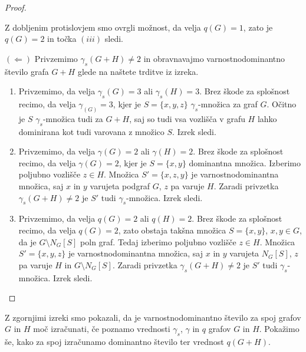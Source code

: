 \documentclass[12pt,a4paper,twoside]{article}
\theoremstyle{definition} %
\theoremstyle{plain} %
\numberwithin{equation}{section}  %
\begin{document}
\begin{proof}
\begin{itemize}
Z dobljenim protislovjem smo ovrgli možnost, da velja $q(G) =1$, zato je $q(G)=2$ in točka $(iii)$ sledi.
\end{itemize}

\noindent $(\Leftarrow)$ Privzemimo $\gamma_s(G+H) \neq 2$ in obravnavajmo varnostnodominantno število grafa $G+H$ glede na naštete trditve iz izreka.
\begin{enumerate}[label=($\roman*)$]
\item Privzemimo, da velja $\gamma_s(G)=3$ ali $\gamma_s(H)=3$. Brez škode za splošnost recimo, da velja $\gamma_(G)=3$, kjer je $S =\{x,y,z\}$ $\gamma_s$-množica za graf $G$. Očitno je $S$ $\gamma_s$-množica tudi za $G+H$, saj so tudi vsa vozlišča v grafu $H$ lahko dominirana kot tudi varovana z množico $S$. Izrek sledi.
\item Privzemimo, da velja $\gamma(G) = 2$ ali $\gamma(H) = 2$. Brez škode za splošnost recimo, da velja $\gamma(G) = 2$, kjer je $S = \{x,y\}$ dominantna množica. Izberimo poljubno vozlišče $z \in H$. Množica $S' = \{x,z,y\}$ je varnostnodominantna množica, saj $x$ in $y$ varujeta podgraf $G$, $z$ pa varuje $H$. Zaradi privzetka $\gamma_s(G+H) \neq 2$ je $S'$ tudi $\gamma_s$-množica. Izrek sledi.
\item Privzemimo, da velja $q(G)=2$ ali $q(H)=2$. Brez škode za splošnost recimo, da velja $q(G)=2$, zato obstaja takšna množica $S =\{x,y\}$, $x,y \in G$, da je $G \setminus N_G[S]$ poln graf. Tedaj izberimo poljubno vozlišče $z \in H$. Množica $S' = \{x,y,z\}$ je varnostnodominantna množica, saj $x$ in $y$ varujeta $N_G[S]$, $z$ pa varuje $H$ in $G \setminus N_G[S]$. Zaradi privzetka $\gamma_s(G+H) \neq 2$ je $S'$ tudi $\gamma_s$-množica. Izrek sledi.\qedhere
\end{enumerate}
\end{proof}

Z zgornjimi izreki smo pokazali, da je varnostnodominantno število za spoj grafov $G$ in $H$ moč izračunati, če poznamo vrednosti $\gamma_s$, $\gamma$ in $q$ grafov $G$ in $H$. Pokažimo še, kako za spoj izračunamo dominantno število ter vrednost $q(G + H)$.
\end{document}

